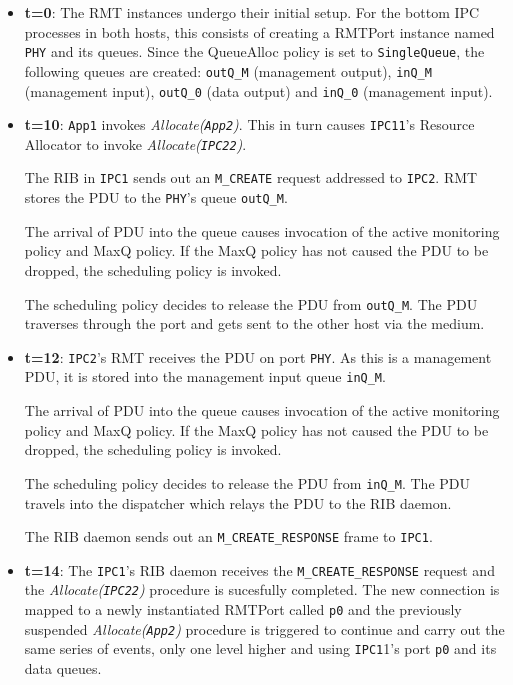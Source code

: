             \begin{itemize}
            \item \textbf{t=0}: The RMT instances undergo their initial setup. For the bottom IPC processes in both hosts, this consists of creating a RMTPort instance named \texttt{PHY} and its queues. Since the QueueAlloc policy is set to \texttt{SingleQueue}, the following queues are created: \texttt{outQ\_M} (management output), \texttt{inQ\_M} (management input), \texttt{outQ\_0} (data output) and \texttt{inQ\_0} (management input).

            \item \textbf{t=10}: \texttt{App1} invokes \emph{Allocate(\texttt{App2})}. This in turn causes \texttt{IPC11}'s Resource Allocator to invoke \emph{Allocate(\texttt{IPC22})}.

                The RIB in \texttt{IPC1} sends out an \texttt{M\_CREATE} request addressed to \texttt{IPC2}. RMT stores the PDU to the \texttt{PHY}'s queue \texttt{outQ\_M}.

                The arrival of PDU into the queue causes invocation of the active monitoring policy and MaxQ policy. If the MaxQ policy has not caused the PDU to be dropped, the scheduling policy is invoked.

                The scheduling policy decides to release the PDU from \texttt{outQ\_M}. The PDU traverses through the port and gets sent to the other host via the medium.

            \item \textbf{t=12}: \texttt{IPC2}'s RMT receives the PDU on port \texttt{PHY}. As this is a management PDU, it is stored into the management input queue \texttt{inQ\_M}.

                The arrival of PDU into the queue causes invocation of the active monitoring policy and MaxQ policy. If the MaxQ policy has not caused the PDU to be dropped, the scheduling policy is invoked.

                The scheduling policy decides to release the PDU from \texttt{inQ\_M}. The PDU travels into the dispatcher which relays the PDU to the RIB daemon.

                The RIB daemon sends out an \texttt{M\_CREATE\_RESPONSE} frame to \texttt{IPC1}.

            \item \textbf{t=14}: The \texttt{IPC1}'s RIB daemon receives the \texttt{M\_CREATE\_RESPONSE} request and the \emph{Allocate(\texttt{IPC22})} procedure is sucesfully completed. The new connection is mapped to a newly instantiated RMTPort called \texttt{p0} and the previously suspended \emph{Allocate(\texttt{App2})} procedure is triggered to continue and carry out the same series of events, only one level higher and using \texttt{IPC1}1's port \texttt{p0} and its data queues.


\end{itemize}
